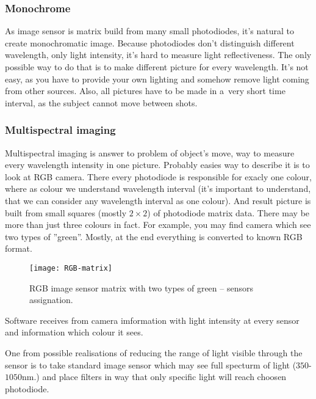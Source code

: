         \subsubsection*{Monochrome}
            As image sensor is matrix build from many small photodiodes,
            it's natural to create monochromatic image.
            Because photodiodes don't distinguish different
            wavelength, only light intensity, it's hard
            to measure light reflectiveness.
            The only possible way to do that is to
            make different picture for every wavelength.
            It's not easy, as you have to
            provide your own lighting and somehow remove
            light coming from other sources.
            Also, all pictures have to be made in
            a~very short time interval, as the subject
            cannot move between shots.

        \subsubsection*{Multispectral imaging}
            Multispectral imaging is answer to
            problem of object's move,
            way to measure every wavelength intensity in one picture.
            Probably easies way to describe it is to look at RGB camera.
            There every photodiode is responsible for exacly one colour,
            where as colour we understand wavelength interval (it's important
            to understand, that we can consider any wavelength interval as one colour).
            And result picture is built from small squares (mostly $2 \times 2$)
            of photodiode matrix data.
            There may be more than just  three colours in fact.
            For example, you may find camera which see two types of ''green''.
            Mostly, at the end everything is converted to known RGB format.

            \begin{figure}[H]
                \caption{RGB image sensor matrix with two types of green -- sensors assignation.}
                \centering
                \texttt{[image: RGB-matrix]}
                \label{fig:RGB-matrix}
            \end{figure}

            Software receives from camera imformation with light intensity at every
            sensor and information which colour it sees.

            One from possible realisations of reducing the range
            of light visible through the sensor is to take standard image sensor which
            may see full specturm of light ($350$-$1050$nm.) and
            place filters in way that only specific light will reach choosen photodiode.


